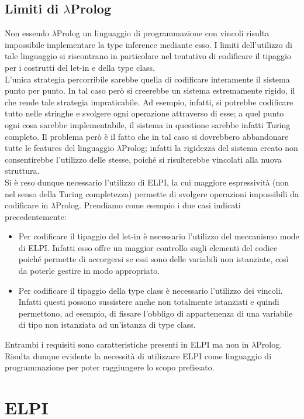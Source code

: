 \documentclass[12pt,a4paper,openright,twoside]{report}
\begin{document}
\subsection{Limiti di $\lambda$Prolog}
Non essendo $\lambda$Prolog un linguaggio di programmazione con vincoli risulta impossibile implementare la type inference mediante esso. I limiti dell'utilizzo di tale linguaggio si riscontrano in particolare nel tentativo di codificare il tipaggio per i costrutti del let-in e della type class.\\
L'unica strategia percorribile sarebbe quella di codificare interamente il sistema punto per punto. In tal caso però si creerebbe un sistema estremamente rigido, il che rende tale strategia impraticabile. Ad esempio, infatti, si potrebbe codificare tutto nelle stringhe e svolgere ogni operazione attraverso di esse; a quel punto ogni cosa sarebbe implementabile, il sistema in questione sarebbe infatti Turing completo. Il problema però è il fatto che in tal caso si dovrebbero abbandonare tutte le features del linguaggio $\lambda$Prolog; infatti la rigidezza del sistema creato non consentirebbe l'utilizzo delle stesse, poiché si risulterebbe vincolati alla nuova struttura.\\
Si è reso dunque necessario l'utilizzo di ELPI, la cui maggiore espressività (non nel senso della Turing completezza) permette di svolgere operazioni impossibili da codificare in $\lambda$Prolog. Prendiamo come esempio i due casi indicati precedentemente:
\begin{itemize}
 \item Per codificare il tipaggio del let-in è necessario l'utilizzo del meccanismo mode di ELPI. Infatti esso offre un maggior controllo sugli elementi del codice poiché permette di accorgersi se essi sono delle variabili non istanziate, così da poterle gestire in modo appropriato.
 \item Per codificare il tipaggio della type class è necessario l'utilizzo dei vincoli. Infatti questi possono sussistere anche non totalmente istanziati e quindi permettono, ad esempio, di fissare l'obbligo di appartenenza di una variabile di tipo non istanziata ad un'istanza di type class.
\end{itemize}
Entrambi i requisiti sono caratteristiche presenti in ELPI ma non in $\lambda$Prolog. Risulta dunque evidente la necessità di utilizzare ELPI come linguaggio di programmazione per poter raggiungere lo scopo prefissato.

\section{ELPI}
\end{document}
